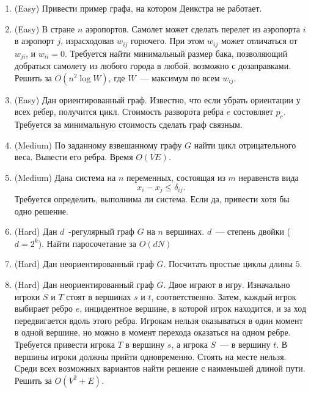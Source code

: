 \section{}

\begin{enumerate}

	\item (Easy) Привести пример графа, на котором Деикстра не работает.
	
	\item (Easy) В стране $n$ аэропортов. Самолет может сделать перелет 
	  из аэропорта $i$ в аэропорт $j$, израсходовав $w_{ij}$ горючего.
	  При этом $w_{ij}$ может отличаться от $w_{ji}$, и $w_{ii} = 0$.
	  Требуется найти минимальный размер бака, позволяющий добраться
	  самолету из любого города в любой, возможно с дозаправками.
	  Решить за $O(n^2 \log W)$, где $W$~--- максимум по всем $w_{ij}$.

	\item (Easy) Дан ориентированный граф. Известно, что если убрать ориентации
	  у всех ребер, получится цикл. Стоимость разворота ребра $e$ состовляет
	  $p_e$. Требуется за минимальную стоимость сделать граф связным.

	\item (Medium) По заданному взвешанному графу $G$ найти цикл отрицательного
	  веса. Вывести его ребра. Время $O(VE)$.

	\item (Medium) Дана система на $n$ переменных, состоящая из $m$ неравенств
	  вида
	  $$
	  	x_i - x_j \leq \delta_{ij}.
	  $$
	  Требуется определить, выполнима ли система. Если да, привести хотя
	  бы одно решение.

    \item (Hard) Дан $d$~-регулярный граф $G$ на $n$ вершинах. 
	  $d$~--- степень двойки ($d = 2^k$). Найти паросочетание 
	  за $O(dN)$
	 
    \item (Hard) Дан неориентированный граф $G$. Посчитать
	  простые циклы длины $5$.

	\item (Hard) Дан неориентированный граф $G$. Двое играют
	  в игру. Изначально игроки $S$ и $T$ стоят в вершинах $s$ и $t$, соответственно. 
	  Затем, каждый игрок выбирает ребро $e$, инцидентное вершине, в которой
	  игрок находится, и за ход передвигается вдоль этого ребра.
	  Игрокам нельзя оказываться в один момент в одной вершине, но
	  можно в момент перехода оказаться на одном ребре. Требуется
	  привести игрока $T$ в вершину $s$, а игрока $S$~--- в вершину
	  $t$. В вершины игроки должны прийти одновременно. Стоять на месте
	  нельзя. Среди всех возможных вариантов найти решение с наименьшей
	  длиной пути. Решить за $O(V^2 + E)$.
	

\end{enumerate}
